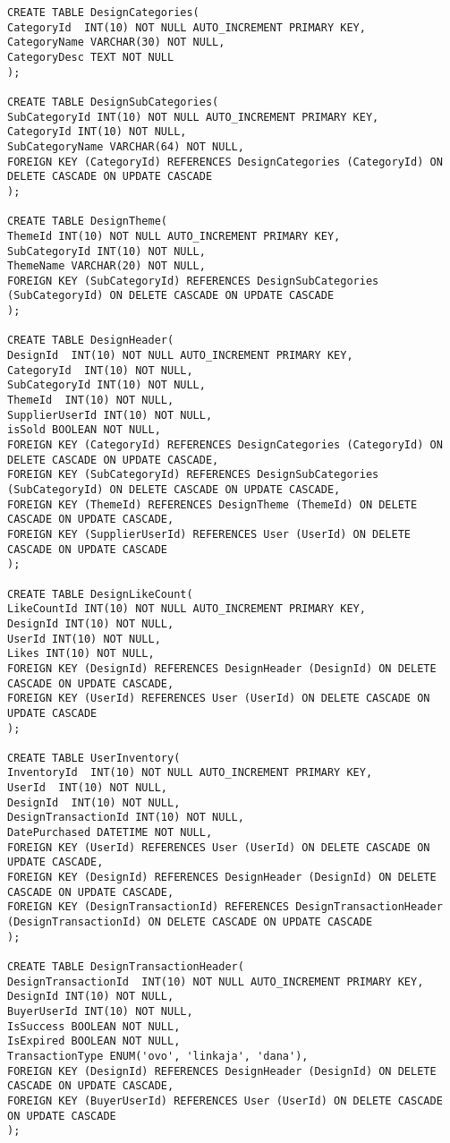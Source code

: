 \begin{lstlisting}
CREATE TABLE DesignCategories(
CategoryId  INT(10) NOT NULL AUTO_INCREMENT PRIMARY KEY,
CategoryName VARCHAR(30) NOT NULL,
CategoryDesc TEXT NOT NULL
);

CREATE TABLE DesignSubCategories(
SubCategoryId INT(10) NOT NULL AUTO_INCREMENT PRIMARY KEY,
CategoryId INT(10) NOT NULL,
SubCategoryName VARCHAR(64) NOT NULL,
FOREIGN KEY (CategoryId) REFERENCES DesignCategories (CategoryId) ON DELETE CASCADE ON UPDATE CASCADE
);

CREATE TABLE DesignTheme(
ThemeId INT(10) NOT NULL AUTO_INCREMENT PRIMARY KEY,
SubCategoryId INT(10) NOT NULL,
ThemeName VARCHAR(20) NOT NULL,
FOREIGN KEY (SubCategoryId) REFERENCES DesignSubCategories (SubCategoryId) ON DELETE CASCADE ON UPDATE CASCADE
);

CREATE TABLE DesignHeader(
DesignId  INT(10) NOT NULL AUTO_INCREMENT PRIMARY KEY,
CategoryId  INT(10) NOT NULL,
SubCategoryId INT(10) NOT NULL,
ThemeId  INT(10) NOT NULL,
SupplierUserId INT(10) NOT NULL,
isSold BOOLEAN NOT NULL,
FOREIGN KEY (CategoryId) REFERENCES DesignCategories (CategoryId) ON DELETE CASCADE ON UPDATE CASCADE,
FOREIGN KEY (SubCategoryId) REFERENCES DesignSubCategories (SubCategoryId) ON DELETE CASCADE ON UPDATE CASCADE,
FOREIGN KEY (ThemeId) REFERENCES DesignTheme (ThemeId) ON DELETE CASCADE ON UPDATE CASCADE,
FOREIGN KEY (SupplierUserId) REFERENCES User (UserId) ON DELETE CASCADE ON UPDATE CASCADE
);

CREATE TABLE DesignLikeCount(
LikeCountId INT(10) NOT NULL AUTO_INCREMENT PRIMARY KEY,
DesignId INT(10) NOT NULL,
UserId INT(10) NOT NULL,
Likes INT(10) NOT NULL,
FOREIGN KEY (DesignId) REFERENCES DesignHeader (DesignId) ON DELETE CASCADE ON UPDATE CASCADE,
FOREIGN KEY (UserId) REFERENCES User (UserId) ON DELETE CASCADE ON UPDATE CASCADE
);

CREATE TABLE UserInventory(
InventoryId  INT(10) NOT NULL AUTO_INCREMENT PRIMARY KEY,
UserId  INT(10) NOT NULL,
DesignId  INT(10) NOT NULL,
DesignTransactionId INT(10) NOT NULL,
DatePurchased DATETIME NOT NULL,
FOREIGN KEY (UserId) REFERENCES User (UserId) ON DELETE CASCADE ON UPDATE CASCADE,
FOREIGN KEY (DesignId) REFERENCES DesignHeader (DesignId) ON DELETE CASCADE ON UPDATE CASCADE,
FOREIGN KEY (DesignTransactionId) REFERENCES DesignTransactionHeader (DesignTransactionId) ON DELETE CASCADE ON UPDATE CASCADE
);

CREATE TABLE DesignTransactionHeader(
DesignTransactionId  INT(10) NOT NULL AUTO_INCREMENT PRIMARY KEY,
DesignId INT(10) NOT NULL,
BuyerUserId INT(10) NOT NULL,
IsSuccess BOOLEAN NOT NULL,
IsExpired BOOLEAN NOT NULL,
TransactionType ENUM('ovo', 'linkaja', 'dana'),
FOREIGN KEY (DesignId) REFERENCES DesignHeader (DesignId) ON DELETE CASCADE ON UPDATE CASCADE,
FOREIGN KEY (BuyerUserId) REFERENCES User (UserId) ON DELETE CASCADE ON UPDATE CASCADE
);


\end{lstlisting}
